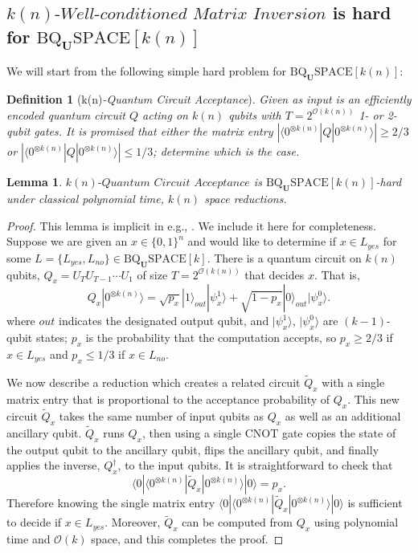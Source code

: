\documentclass[11pt]{article}
\newtheorem{definition}{Definition}
\newtheorem{lemma}{Lemma}
\theoremstyle{definition}
\theoremstyle{remark}
\newcommand\matrixinvert[1]{{\ensuremath{#1}}\textit{-Well-conditioned Matrix Inversion}}
\newcommand\qca[1]{#1\textit{-Quantum Circuit Acceptance}}
\newcommand{\zero}{\ensuremath{0^{\otimes{k(n)}}}}
\newcommand{\classfont}{\mathrm}
\newcommand{\Unitary}{\mathbf{U}}
\newcommand{\unitaryBQSPACE}[1]{\classfont{BQ}_\Unitary\classfont{SPACE}[#1]}
\begin{document}
\subsection{$\matrixinvert{k(n)}$ is hard for $\unitaryBQSPACE{k(n)}$}
We will start from the following simple hard problem for $\unitaryBQSPACE{k(n)}$:
\begin{definition}[\qca{k(n)}]
	Given as input is an efficiently encoded quantum circuit $Q$ acting on $k(n)$ qubits with $T = 2^{\mathcal{O}(k(n))}$ 1- or 2-qubit gates.  It is promised that either the matrix entry $|\langle {\zero}|Q|{\zero}\rangle| \geq 2/3$ or $|\langle {\zero}|Q|{\zero}\rangle| \leq 1/3$; determine which is the case.
\end{definition}
\begin{lemma}
	$\qca{k(n)}$ is $\unitaryBQSPACE{k(n)}$-hard under classical polynomial time, $k(n)$ space reductions.
\end{lemma}
\begin{proof}
This lemma is implicit in e.g., \cite{bbbv,dawsonnielsen}.  We include it here for completeness.  Suppose we are given an $x\in \{0,1\}^n$ and would like to determine if $x\in L_{yes}$ for some $L=\{L_{yes},L_{no}\}\in\unitaryBQSPACE{k}$.  There is a quantum circuit on $k(n)$ qubits, $Q_x=U_TU_{T-1}\cdots U_1$ of size $T=2^{\mathcal{O}(k(n))}$ that decides $x$.  That is, 
\begin{equation}
Q_x|\zero\rangle = \sqrt{p_x} |1\rangle_{out}|\psi_x^1\rangle + \sqrt{1-p_x} |0\rangle_{out} |\psi_x^0\rangle.
\end{equation}
where $out$ indicates the designated output qubit, and $|\psi_x^1\rangle$, $|\psi_x^0\rangle$ are $(k-1)$-qubit states; $p_x$ is the probability that the computation accepts, so $p_x \ge 2/3$ if $x \in L_{yes}$ and $p_x \le 1/3$ if $x \in L_{no}$.

We now describe a reduction which creates a related circuit $\tilde{Q}_x$ with a single matrix entry that is proportional to the acceptance probability of $Q_x$.  This new circuit $\tilde{Q}_x$ takes the same number of input qubits as $Q_x$ as well as an additional ancillary qubit.  $\tilde{Q}_x$ runs $Q_x$, then using a single CNOT gate copies the state of the output qubit to the ancillary qubit, flips the ancillary qubit, and finally applies the inverse, $Q_x^{\dagger}$, to the input qubits. It is straightforward to check that
\begin{equation}
\langle 0|\langle \zero|\tilde{Q}_x|\zero\rangle|0\rangle = p_x.
\end{equation}
Therefore knowing the single matrix entry $\langle 0|\langle \zero|\tilde{Q}_x|\zero\rangle|0\rangle$ is sufficient to decide if $x \in L_{yes}$. Moreover, $\tilde{Q}_x$ can be computed from $Q_x$ using polynomial time and $\mathcal{O}(k)$ space, and this completes the proof.
\end{proof}
\end{document}
